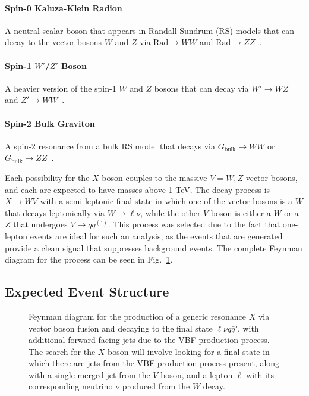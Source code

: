 \paragraph{Spin-0 Kaluza-Klein Radion}
A neutral scalar boson that appears in Randall-Sundrum (RS) models that can decay to the vector bosons $W$ and $Z$ via $\mathrm{Rad}\to WW$ and $\mathrm{Rad}\to ZZ$~\cite{Goldberger_1999,Goldberger_2000}.

\paragraph{Spin-1 $W'$/$Z'$ Boson}
A heavier version of the spin-1 $W$ and $Z$ bosons that can decay via $W'\to WZ$ and $Z'\to WW$~\cite{Pappadopulo_2014}.

\paragraph{Spin-2 Bulk Graviton}
A spin-2 resonance from a bulk RS model that decays via $G_\mathrm{bulk}\to WW$ or $G_\mathrm{bulk}\to ZZ$~\cite{Fitzpatrick_2007,PhysRevD.76.036006}.

Each possibility for the $X$ boson couples to the massive $V=W,Z$ vector bosons, and each are expected to have masses above 1 TeV.
The decay process is $X\to WV$ with a semi-leptonic final state in which one of the vector bosons is a $W$ that decays leptonically via $W\to\ell\nu$, while the other $V$ boson is either a $W$ or a $Z$ that undergoes $V\to q\bar{q}^{(\prime)}$.
This process was selected due to the fact that one-lepton events are ideal for such an analysis, as the events that are generated provide a clean signal that suppresses background events.
The complete Feynman diagram for the process can be seen in Fig.~\ref{fig:vbfFeynman}.

\subsection{Expected Event Structure}

\begin{figure}[htbp]
  \centering
  
  \caption{Feynman diagram for the production of a generic resonance $X$ via vector boson fusion and decaying to the final state $\ell\nu q\bar{q}'$, with additional forward-facing jets due to the VBF production process. The search for the $X$ boson will involve looking for a final state in which there are jets from the VBF production process present, along with a single merged jet from the $V$ boson, and a lepton $\ell$ with its corresponding neutrino $\nu$ produced from the $W$ decay.}
  \label{fig:vbfFeynman}
\end{figure}

